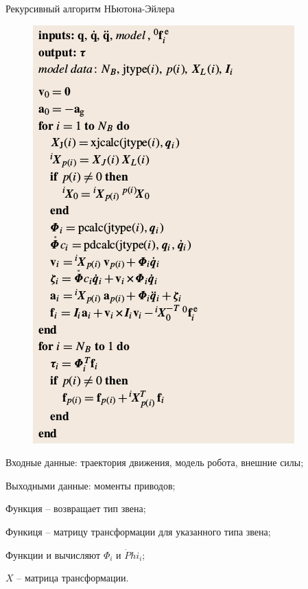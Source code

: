 \documentclass[newPxFont,numfooter,sectionpages]{beamer}
\begin{document}
\begin{frame}{Рекурсивный алгоритм НЬютона-Эйлера}
	\begin{minipage}{0.45\textwidth}
	\begin{center}
	\begin{figure}[H]
	\center\includegraphics[width=1\linewidth]{555.png}
	\end{figure}
	\end{center}
	
\end{minipage}
\hfill
\begin{minipage}{0.45\textwidth}
Входные данные: траектория движения, модель робота, внешние силы;

Выходными данные: моменты приводов;

Функция  -- возвращает тип звена;

Функиця  -- матрицу трансформации для указанного типа звена;

Функции  и  вычисляют $\Phi_i$ и $\dot Phi_i$;

$X$ -- матрица трансформации.
\end{minipage}

\end{frame}
\end{document}
